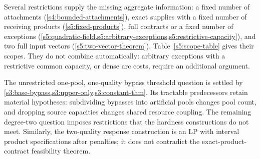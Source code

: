 Several restrictions supply the missing aggregate information: a fixed
number of attachments (\cref{s4:bounded-attachments}), exact supplies
with a fixed number of receiving products (\cref{s5:fixed-products}),
full contracts or a fixed number of exceptions
(\cref{s5:quadratic-field,s5:arbitrary-exceptions,s5:restrictive-capacity}),
and two full input vectors (\cref{s5:two-vector-theorem}).
Table~\ref{s5:scope-table} gives their scopes. They do not combine
automatically: arbitrary exceptions with a restrictive common capacity,
or dense arc costs, require an additional argument.

The unrestricted one-pool, one-quality bypass threshold question is
settled by \cref{s3:base-bypass,s3:upper-only,s3:constant-thm}. Its
tractable predecessors retain material hypotheses: subdividing bypasses
into artificial pools changes pool count, and dropping source capacities
changes shared resource coupling. The remaining degree-two question
imposes restrictions that the hardness constructions do not meet.
Similarly, the two-quality response construction is an LP with interval
product specifications after penalties; it does not contradict the
exact-product-contract feasibility theorem.

